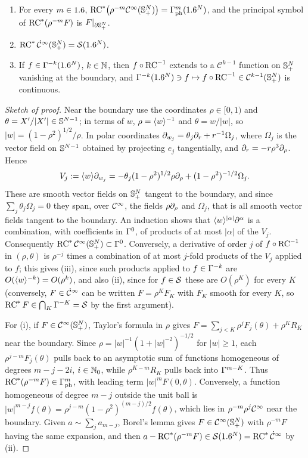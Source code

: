 \begin{proposition}\label{isotropic:prop:rc}
\begin{enumerate}[label=\textup{(\roman*)}]
\item For every $m\in1.6$, $\operatorname{RC}^*\bigl(\rho^{-m}\mathcal{C}^\infty(\mathbb{S}^{N}_{+})\bigr)=\Gamma^{m}_{\mathrm{ph}}(1.6^N)$, and the
  principal symbol of $\operatorname{RC}^*(\rho^{-m}F)$ is $F|_{\partial\mathbb{S}^{N}_{+}}$.
\item $\operatorname{RC}^*\dot{\mathcal{C}}^\infty(\mathbb{S}^{N}_{+})=\mathcal{S}(1.6^N)$.
\item If $f\in\Gamma^{-k}(1.6^N)$, $k\in\mathbb{N}$, then $f\circ\operatorname{RC}^{-1}$ extends to a
  $\mathcal C^{k-1}$ function on $\mathbb{S}^{N}_{+}$ vanishing at the boundary, and
  $\Gamma^{-k}(1.6^N)\ni f\mapsto f\circ\operatorname{RC}^{-1}\in\mathcal C^{k-1}(\mathbb{S}^{N}_{+})$ is continuous.
\end{enumerate}
\end{proposition}
\begin{proof}[Sketch of proof]
Near the boundary use the coordinates $\rho\in[0,1)$ and
$\theta=X'/|X'|\in\mathbb{S}^{N-1}$; in terms of $w$, $\rho=\langle w\rangle^{-1}$ and
$\theta=w/|w|$, so $|w|=(1-\rho^2)^{1/2}/\rho$. In polar coordinates
$\partial_{w_j}=\theta_j\partial_r+r^{-1}\Omega_j$, where $\Omega_j$ is the vector field
on $\mathbb{S}^{N-1}$ obtained by projecting $e_j$ tangentially, and
$\partial_r=-r\rho^3\partial_\rho$. Hence
\begin{equation}\label{isotropic:eq:b-fields}
  V_j:=\langle w\rangle\partial_{w_j}=-\theta_j(1-\rho^2)^{1/2}\rho\partial_\rho+(1-\rho^2)^{-1/2}\Omega_j .
\end{equation}
These are smooth vector fields on $\mathbb{S}^{N}_{+}$ tangent to the boundary, and
since $\sum_j\theta_j\Omega_j=0$ they span, over $\mathcal{C}^\infty$, the fields $\rho\partial_\rho$
and $\Omega_j$, that is all smooth vector fields tangent to the boundary. An
induction shows that $\langle w\rangle^{|\alpha|}\partial^\alpha$ is a combination, with
coefficients in $\Gamma^{0}$, of products of at most $|\alpha|$ of the $V_j$.
Consequently $\operatorname{RC}^*\mathcal{C}^\infty(\mathbb{S}^{N}_{+})\subset\Gamma^{0}$. Conversely, a derivative of
order $j$ of $f\circ\operatorname{RC}^{-1}$ in $(\rho,\theta)$ is $\rho^{-j}$ times a
combination of at most $j$-fold products of the $V_j$ applied to $f$; this
gives (iii), since such products applied to $f\in\Gamma^{-k}$ are
$O(\langle w\rangle^{-k})=O(\rho^k)$, and also (ii), since for $f\in\mathcal{S}$ these are
$O(\rho^K)$ for every $K$ (conversely, $F\in\dot{\mathcal{C}}^\infty$ can be written $F=\rho^KF_K$ with $F_K$ smooth for every $K$,
so $\operatorname{RC}^*F\in\bigcap_K\Gamma^{-K}=\mathcal{S}$ by the first argument).

For (i), if $F\in\mathcal{C}^\infty(\mathbb{S}^{N}_{+})$, Taylor's formula in $\rho$ gives
$F=\sum_{j<K}\rho^jF_j(\theta)+\rho^KR_K$ near the boundary. Since
$\rho=|w|^{-1}(1+|w|^{-2})^{-1/2}$ for $|w|\ge1$, each $\rho^{j-m}F_j(\theta)$
pulls back to an asymptotic sum of functions homogeneous of degrees
$m-j-2i$, $i\in\mathbb{N}_0$, while $\rho^{K-m}R_K$ pulls back into $\Gamma^{m-K}$. Thus
$\operatorname{RC}^*(\rho^{-m}F)\in\Gamma^{m}_{\mathrm{ph}}$, with leading term $|w|^mF(0,\theta)$. Conversely,
a function homogeneous of degree $m-j$ outside the unit ball is
$|w|^{m-j}f(\theta)=\rho^{j-m}(1-\rho^2)^{(m-j)/2}f(\theta)$, which lies in
$\rho^{-m}\rho^j\mathcal{C}^\infty$ near the boundary. Given $a\sim\sum_ja_{m-j}$, Borel's
lemma gives $F\in\mathcal{C}^\infty(\mathbb{S}^{N}_{+})$ with $\rho^{-m}F$ having the same expansion,
and then $a-\operatorname{RC}^*(\rho^{-m}F)\in\mathcal{S}(1.6^N)=\operatorname{RC}^*\dot{\mathcal{C}}^\infty$ by (ii).
\end{proof}


